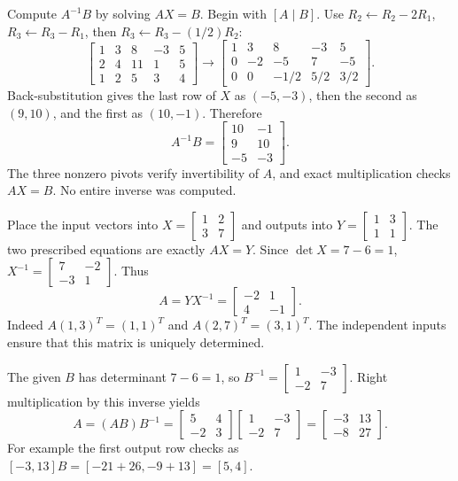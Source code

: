 Compute $A^{-1}B$ by solving $AX=B$. Begin with $[A\mid B]$.
Use $R_2\gets R_2-2R_1$, $R_3\gets R_3-R_1$, then
$R_3\gets R_3-(1/2)R_2$:
\[
 \left[\begin{array}{rrr|rr}1&3&8&-3&5\\2&4&11&1&5\\1&2&5&3&4\end{array}\right]
 \longrightarrow
 \left[\begin{array}{rrr|rr}1&3&8&-3&5\\0&-2&-5&7&-5\\0&0&-1/2&5/2&3/2\end{array}\right].
\]
Back-substitution gives the last row of $X$ as $(-5,-3)$,
then the second as $(9,10)$, and the first as $(10,-1)$.
Therefore
\[
 \boxed{A^{-1}B=\begin{bmatrix}10&-1\\9&10\\-5&-3\end{bmatrix}}.
\]
The three nonzero pivots verify invertibility of $A$, and exact
multiplication checks $AX=B$. No entire inverse was computed.

Place the input vectors into $X=\begin{bmatrix}1&2\\3&7\end{bmatrix}$
and outputs into $Y=\begin{bmatrix}1&3\\1&1\end{bmatrix}$.
The two prescribed equations are exactly $AX=Y$.
Since $\det X=7-6=1$, $X^{-1}=\begin{bmatrix}7&-2\\-3&1\end{bmatrix}$.
Thus
\[
 \boxed{A=YX^{-1}=\begin{bmatrix}-2&1\\4&-1\end{bmatrix}}.
\]
Indeed $A(1,3)^T=(1,1)^T$ and $A(2,7)^T=(3,1)^T$.
The independent inputs ensure that this matrix is uniquely determined.

The given $B$ has determinant $7-6=1$, so
$B^{-1}=\begin{bmatrix}1&-3\\-2&7\end{bmatrix}$.
Right multiplication by this inverse yields
\[
 A=(AB)B^{-1}
 =\begin{bmatrix}5&4\\-2&3\end{bmatrix}
  \begin{bmatrix}1&-3\\-2&7\end{bmatrix}
 =\boxed{\begin{bmatrix}-3&13\\-8&27\end{bmatrix}}.
\]
For example the first output row checks as
$[-3,13]B=[-21+26,-9+13]=[5,4]$.

